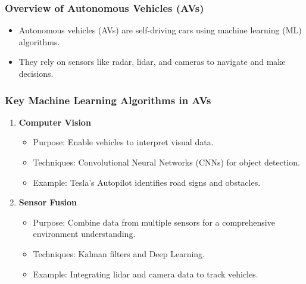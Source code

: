 \documentclass{beamer}
\begin{document}
\begin{frame}[fragile]
    \frametitle{Overview of Autonomous Vehicles (AVs)}
    \begin{itemize}
        \item Autonomous vehicles (AVs) are self-driving cars using machine learning (ML) algorithms.
        \item They rely on sensors like radar, lidar, and cameras to navigate and make decisions.
    \end{itemize}
\end{frame}

\begin{frame}[fragile]
    \frametitle{Key Machine Learning Algorithms in AVs}
    \begin{enumerate}
        \item \textbf{Computer Vision}
            \begin{itemize}
                \item Purpose: Enable vehicles to interpret visual data.
                \item Techniques: Convolutional Neural Networks (CNNs) for object detection.
                \item Example: Tesla's Autopilot identifies road signs and obstacles.
            \end{itemize}
        \item \textbf{Sensor Fusion}
            \begin{itemize}
                \item Purpose: Combine data from multiple sensors for a comprehensive environment understanding.
                \item Techniques: Kalman filters and Deep Learning.
                \item Example: Integrating lidar and camera data to track vehicles.
            \end{itemize}
    \end{enumerate}
\end{frame}
\end{document}
